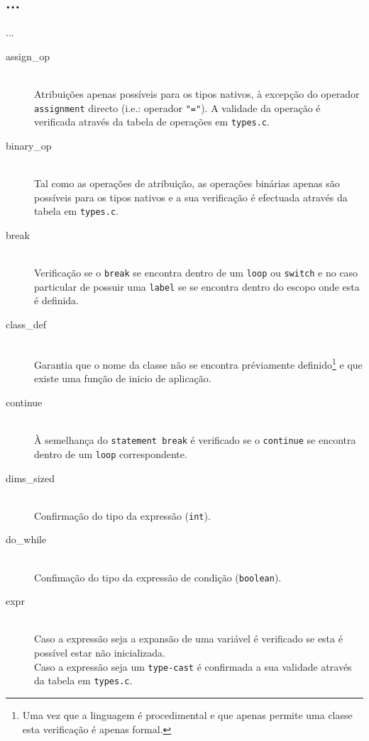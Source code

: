 \documentclass[a4paper]{article}
\begin{document}
\subsection{...}
\indent \indent ...

\begin{description}
	\item [assign\_op] \hfill \\
		Atribuições apenas possíveis para os tipos nativos, à excepção do operador \texttt{assignment} directo (i.e.: operador \texttt{"="}).
		A validade da operação é verificada através da tabela de operações em \texttt{types.c}.

	\item [binary\_op] \hfill \\
		Tal como as operações de atribuição, as operações binárias apenas são possíveis para os tipos nativos e a sua verificação
		é efectuada através da tabela em \texttt{types.c}.

	\item [break] \hfill \\
		Verificação se o \texttt{break} se encontra dentro de um \texttt{loop} ou \texttt{switch}
		e no caso particular de possuir uma \texttt{label} se se encontra dentro do escopo onde esta é definida.

	\item [class\_def] \hfill \\
		Garantia que o nome da classe não se encontra préviamente definido\footnote[1]{Uma vez que a linguagem é procedimental e que apenas permite uma classe esta verificação é apenas formal.} e que existe uma função
		de inicio de aplicação.

	\item [continue] \hfill \\
		À semelhança do \texttt{statement break} é verificado se o \texttt{continue} se encontra dentro de um \texttt{loop} correspondente.

	\item [dims\_sized] \hfill \\
		Confirmação do tipo da expressão (\texttt{int}).

	\item [do\_while] \hfill \\
		Confimação do tipo da expressão de condição (\texttt{boolean}).

	\item [expr] \hfill \\
		Caso a expressão seja a expansão de uma variável é verificado se esta é possível estar não inicializada. \\
		Caso a expressão seja um \texttt{type-cast} é confirmada a sua validade através da tabela em \texttt{types.c}.


\end{description}
\end{document}
